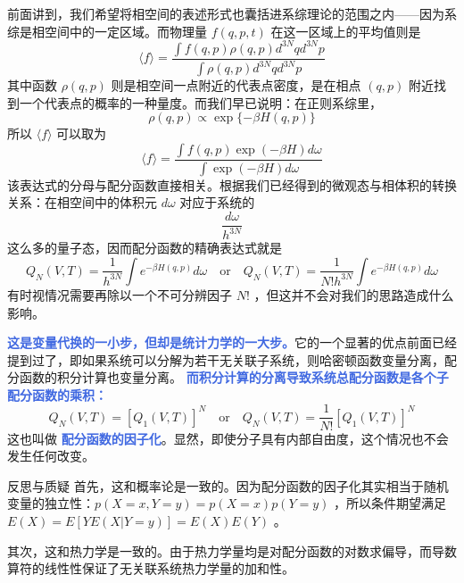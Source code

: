 前面讲到，我们希望将相空间的表述形式也囊括进系综理论的范围之内——因为系综是相空间中的一定区域。而物理量 $f(q,p,t)$ 在这一区域上的平均值则是
\begin{equation}
    \langle f\rangle=\frac{\int f(q, p) \rho(q, p) d^{3 N} q d^{3 N} p}{\int \rho(q, p) d^{3 N} q d^{3 N} p}
\end{equation}
其中函数 $\rho(q,p)$ 则是相空间一点附近的代表点密度，是在相点 $(q,p)$ 附近找到一个代表点的概率的一种量度。而我们早已说明：在正则系综里，
\begin{equation}
    \rho(q, p) \propto \exp \{-\beta H(q, p)\}
\end{equation}
所以 $\langle f \rangle$ 可以取为
\begin{equation}
    \langle f\rangle=\frac{\int f(q, p) \exp (-\beta H) d \omega}{\int \exp (-\beta H) d \omega}
\end{equation}
该表达式的分母与配分函数直接相关。根据我们已经得到的微观态与相体积的转换关系：在相空间中的体积元 $d\omega$ 对应于系统的
\[
    \frac{d\omega}{h^{3N}} 
\]
这么多的量子态，因而配分函数的精确表达式就是
\begin{equation}\label{equ:phaseintegrate}
    Q_N(V, T)=\frac{1}{ h^{3 N}} \int e^{-\beta H(q, p)} d \omega\quad\text{or}\quad Q_N(V, T)=\frac{1}{N! h^{3 N}} \int e^{-\beta H(q, p)} d \omega
\end{equation}
有时视情况需要再除以一个不可分辨因子 $N!$ ，但这并不会对我们的思路造成什么影响。

\textcolor{RoyalBlue}{\textbf{\kaishu 这是变量代换的一小步，但却是统计力学的一大步。}}它的一个显著的优点前面已经提到过了，即如果系统可以分解为若干无关联子系统，则哈密顿函数变量分离，配分函数的积分计算也变量分离。 \textcolor{RoyalBlue}{\textbf{\kaishu  而积分计算的分离导致系统总配分函数是各个子配分函数的乘积：}}
\begin{equation}\label{equ:yinzihua}
    Q_N(V, T)=\left[Q_1(V, T)\right]^N \quad\text{or}\quad Q_N(V, T)=\frac{1}{N !}\left[Q_1(V, T)\right]^N
\end{equation}
这也叫做 \textcolor{RoyalBlue}{\textbf{\kaishu 配分函数的因子化}}。显然，即使分子具有内部自由度，这个情况也不会发生任何改变。

\begin{justification}{\kaishu 反思与质疑}
\kaishu \fontsize{11pt}{16pt}
    \quad\quad 首先，这和概率论是一致的。因为配分函数的因子化其实相当于随机变量的独立性：$p(X = x, Y = y) = p(X = x)p(Y = y)$ ，所以条件期望满足 $E(X) = E[YE(X|Y = y)] = E(X)E(Y)$ 。

    \quad\quad 其次，这和热力学是一致的。由于热力学量均是对配分函数的对数求偏导，而导数算符的线性性保证了无关联系统热力学量的加和性。
\end{justification}


